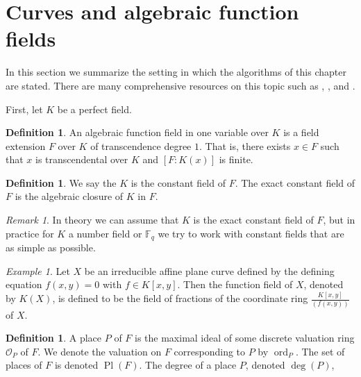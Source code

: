 \documentclass{dcthesis}
\newcommand{\OO}{\mathcal O}
\newcommand{\defi}[1]{\textsf{#1}}
\newcommand{\FF}{\mathbb{F}}
\DeclareMathOperator{\ord}{ord}
\DeclareMathOperator{\Pl}{Pl}
\numberwithin{equation}{section}
\theoremstyle{definition}
\newtheorem{definition}[equation]{Definition}
\theoremstyle{remark}
\newtheorem{remark}[equation]{Remark}
\newtheorem{example}[equation]{Example}
\begin{document}
{{  \section{Curves and algebraic function fields}{
    \label{sec:algebraicfunctionfields}
    In this section we summarize the
    setting in which the algorithms of this
    chapter are stated.
    There are many comprehensive resources
    on this topic such as
    \cite[I.6]{hartshorne},
    \cite{stick},
    and
    \cite{rosen}.
    \par
    First, let $K$ be a perfect field.
    \begin{definition}
      \label{def:algfuncfield}
      An \defi{algebraic function field
      in one variable over $K$}
      is a field extension $F$
      over $K$
      of transcendence degree $1$.
      That is,
      there exists $x\in F$ such that
      $x$ is transcendental over $K$
      and $[F:K(x)]$ is finite.
    \end{definition}
    \begin{definition}
      \label{def:exactconstantfield}
      We say the $K$ is the
      \defi{constant field}
      of $F$.
      The \defi{exact constant field}
      of $F$ is the algebraic closure
      of $K$ in $F$.
    \end{definition}
    \begin{remark}
      \label{rmk:constantfields}
      In theory we can assume that
      $K$ is the exact constant field of $F$,
      but in practice for $K$ a number field
      or $\FF_q$ we try to work with
      constant fields that are as simple as
      possible.
    \end{remark}
    \begin{example}
      \label{exm:functionfieldofcurve}
      Let $X$ be an irreducible affine plane curve
      defined by the defining equation
      $f(x,y)=0$ with
      $f\in K[x,y]$.
      Then \defi{the function field of $X$},
      denoted by $K(X)$, is defined to be
      the field of fractions of the coordinate
      ring
      $\frac{K[x,y]}{(f(x,y))}$
      of $X$.
    \end{example}
    \begin{definition}
      \label{def:functionfieldplace}
      A \defi{place} $P$ of $F$ is the
      maximal ideal of some discrete
      valuation ring $\OO_P$ of $F$.
      We denote the valuation on $F$
      corresponding to $P$ by $\ord_P$.
      The set of places of $F$
      is denoted $\Pl(F)$.
      The \defi{degree} of a place $P$,
      denoted $\deg(P)$,

\end{definition}}}}
\end{document}
